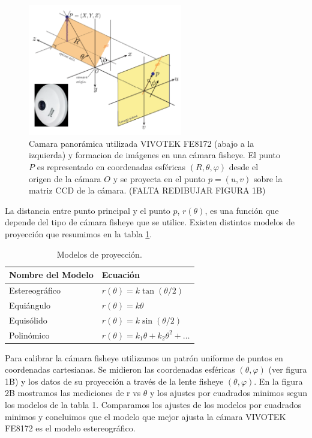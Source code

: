 \documentclass[12pt,a4paper]{article}
\begin{document}
\begin{figure}[!h]
  \centering
  \includegraphics[width=0.6\textwidth]{coord.png}
  \caption{Camara panorámica utilizada VIVOTEK FE8172  (abajo a la izquierda) y formacion de imágenes en una cámara fisheye. El punto $P$ es representado en coordenadas esféricas $(R,\theta,\varphi)$ desde el origen de la cámara $O$ y se proyecta en el punto $p=(u,v)$ sobre la matriz CCD de la cámara. (FALTA REDIBUJAR FIGURA 1B)}
  \label{fig:coord}
\end{figure}

La distancia entre punto principal y el punto $p$, $r(\theta)$, es una función que depende del tipo de cámara fisheye que se utilice.  Existen distintos modelos de proyección que resumimos en la tabla \ref{tab:mods}.

\begin{table}[h]
  \centering
  \caption{Modelos de proyección.}
  \label{tab:mods}
  \begin{tabular}{*{2}{l}}
    \toprule
      Nombre del Modelo & Ecuación \\
    \midrule
      Estereográfico & $r(\theta) = k \tan \left(\theta/2\right)$\\
      Equiángulo & $r(\theta) = k \theta$ \\
      Equisólido & $r(\theta) = k \sin \left(\theta/2\right)$ \\
      Polinómico & $r(\theta) = k_1 \theta + k_2 \theta^2 + \dots$ \\
    \bottomrule
  \end{tabular}
\end{table}

Para calibrar la cámara fisheye utilizamos un patrón uniforme de puntos en coordenadas cartesianas. Se midieron las coordenadas esféricas $(\theta,\varphi)$ (ver figura 1B) y los datos de su proyección a través de la lente fisheye $(\theta,\varphi)$. En la figura 2B mostramos las mediciones de r vs $\theta$ y los ajustes por cuadrados minimos segun los modelos  de la tabla 1. Comparamos los ajustes de los modelos por cuadrados minimos y concluimos que el modelo que mejor ajusta la cámara VIVOTEK FE8172 es el modelo estereográfico. 
\end{document}
